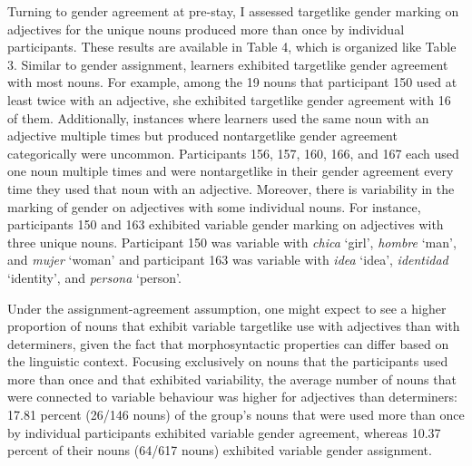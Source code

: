 \documentclass[12pt]{article}
\newenvironment{styleNoSpacing}{\setlength\leftskip{0cm}\setlength\rightskip{0cm plus 1fil}\setlength\parindent{0cm}\setlength\parfillskip{0pt plus 1fil}\setlength\parskip{0cm plus 1pt}\writerlistparindent\writerlistleftskip\leavevmode\normalfont\normalsize\fontsize{11pt}{13.2pt}\selectfont\writerlistlabel\ignorespaces}{\unskip\vspace{0cm plus 1pt}\par}
\newcommand\writerlistleftskip{}
\newcommand\writerlistparindent{}
\newcommand\writerlistlabel{}
\begin{document}
\begin{styleNoSpacing}
Turning to gender agreement at pre-stay, I assessed targetlike gender marking on adjectives for the unique nouns produced more than once by individual participants. These results are available in Table 4, which is organized like Table 3. Similar to gender assignment, learners exhibited targetlike gender agreement with most nouns. For example, among the 19 nouns that participant 150 used at least twice with an adjective, she exhibited targetlike gender agreement with 16 of them. Additionally, instances where learners used the same noun with an adjective multiple times but produced nontargetlike gender agreement categorically were uncommon. Participants 156, 157, 160, 166, and 167 each used one noun multiple times and were nontargetlike in their gender agreement every time they used that noun with an adjective. Moreover, there is variability in the marking of gender on adjectives with some individual nouns. For instance, participants 150 and 163 exhibited variable gender marking on adjectives with three unique nouns. Participant 150 was variable with \textit{chica }‘girl’,\textit{ hombre }‘man’, and \textit{mujer }‘woman’ and participant 163 was variable with \textit{idea }‘idea’,\textit{ identidad }‘identity’, and \textit{persona} ‘person’.
\end{styleNoSpacing}

\begin{styleNoSpacing}
Under the assignment-agreement assumption, one might expect to see a higher proportion of nouns that exhibit variable targetlike use with adjectives than with determiners, given the fact that morphosyntactic properties can differ based on the linguistic context. Focusing exclusively on nouns that the participants used more than once and that exhibited variability, the average number of nouns that were connected to variable behaviour was higher for adjectives than determiners: 17.81 percent (26/146 nouns) of the group’s nouns that were used more than once by individual participants exhibited variable gender agreement, whereas 10.37 percent of their nouns (64/617 nouns) exhibited variable gender assignment. 
\end{styleNoSpacing}
\end{document}
